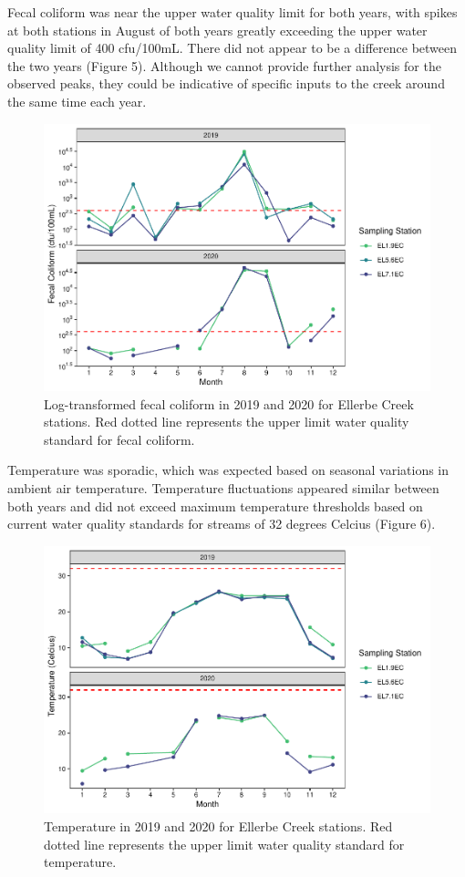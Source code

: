 \documentclass[
  12pt,
]{article}
\begin{document}
Fecal coliform was near the upper water quality limit for both years,
with spikes at both stations in August of both years greatly exceeding
the upper water quality limit of 400 cfu/100mL. There did not appear to
be a difference between the two years (Figure 5). Although we cannot
provide further analysis for the observed peaks, they could be
indicative of specific inputs to the creek around the same time each
year.

\begin{figure}
\centering
\includegraphics{August_Lindborg_ENV872_Project_files/figure-latex/unnamed-chunk-17-1.pdf}
\caption{Log-transformed fecal coliform in 2019 and 2020 for Ellerbe
Creek stations. Red dotted line represents the upper limit water quality
standard for fecal coliform.}
\end{figure}

Temperature was sporadic, which was expected based on seasonal
variations in ambient air temperature. Temperature fluctuations appeared
similar between both years and did not exceed maximum temperature
thresholds based on current water quality standards for streams of 32
degrees Celcius (Figure 6).

\begin{figure}
\centering
\includegraphics{August_Lindborg_ENV872_Project_files/figure-latex/unnamed-chunk-18-1.pdf}
\caption{Temperature in 2019 and 2020 for Ellerbe Creek stations. Red
dotted line represents the upper limit water quality standard for
temperature.}
\end{figure}
\end{document}

